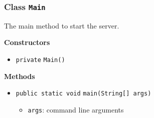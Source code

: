 \subsubsection{Class \lstinline|Main|}
The main method to start the server. \\
\noindent\begin{minipage}[t]{5cm}
\vspace{0.3em}
\hspace*{2em}
\vspace{0.3em}
\end{minipage}




\textbf{\sffamily Constructors}
\begin{itemize}
\item \lstinline|private| \lstinline|Main|\lstinline|()| \\[-0.6em]




\end{itemize}


\textbf{\sffamily Methods}
\begin{itemize}
\item \lstinline|public static void| \lstinline|main|\lstinline|(String[] args)| \\[-0.6em]

\begin{itemize}
\item \lstinline|args|: command line arguments
\end{itemize}



\end{itemize}


